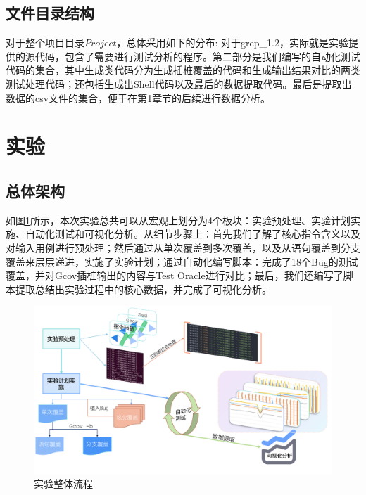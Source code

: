 \documentclass[12pt, a4paper, oneside,bibend=bibtex]{ctexart}
\begin{document}
\subsection{文件目录结构}
对于整个项目目录$Project$，总体采用如下的分布:
对于grep\_1.2，实际就是实验提供的源代码，包含了需要进行测试分析的程序。第二部分是我们编写的自动化测试代码的集合，其中生成类代码分为生成插桩覆盖的代码和生成输出结果对比的两类测试处理代码；还包括生成出Shell代码以及最后的数据提取代码。最后是提取出数据的csv文件的集合，便于在第\ref{实验章节}章节的后续进行数据分析。


\section{实验}\label{实验章节}

\subsection{总体架构}
如图\ref{实验流程图}所示，本次实验总共可以从宏观上划分为4个板块：实验预处理、实验计划实施、自动化测试和可视化分析。从细节步骤上：首先我们了解了核心指令含义以及对输入用例进行预处理；然后通过从单次覆盖到多次覆盖，以及从语句覆盖到分支覆盖来层层递进，实施了实验计划；通过自动化编写脚本：完成了18个Bug的测试覆盖，并对Gcov插桩输出的内容与Test Oracle进行对比；最后，我们还编写了脚本提取总结出实验过程中的核心数据，并完成了可视化分析。

\begin{figure}[htbp]
    \centering
    \includegraphics[width=1\linewidth]{images/exp_pro.pdf}
    \caption{实验整体流程}
    \label{实验流程图}
\end{figure}
\end{document}
